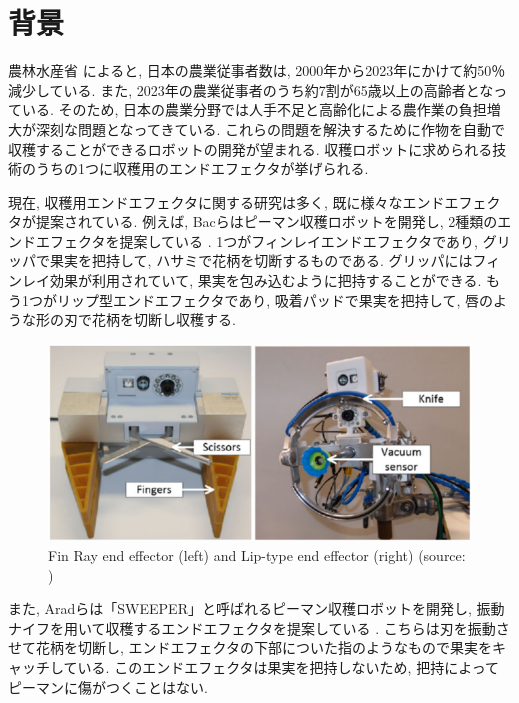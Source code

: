 
\section{背景}
農林水産省 \cite{farmer} によると, 日本の農業従事者数は, 2000年から2023年にかけて約50％減少している.
また, 2023年の農業従事者のうち約7割が65歳以上の高齢者となっている.
そのため, 日本の農業分野では人手不足と高齢化による農作業の負担増大が深刻な問題となってきている.
これらの問題を解決するために作物を自動で収穫することができるロボットの開発が望まれる.
収穫ロボットに求められる技術のうちの1つに収穫用のエンドエフェクタが挙げられる.

\vspace{5mm}

現在, 収穫用エンドエフェクタに関する研究は多く, 既に様々なエンドエフェクタが提案されている.
例えば, Bacらはピーマン収穫ロボットを開発し, 2種類のエンドエフェクタを提案している \cite{finray}.
1つがフィンレイエンドエフェクタであり, グリッパで果実を把持して, ハサミで花柄を切断するものである.
グリッパにはフィンレイ効果が利用されていて, 果実を包み込むように把持することができる.
もう1つがリップ型エンドエフェクタであり, 吸着パッドで果実を把持して, 唇のような形の刃で花柄を切断し収穫する.

\begin{figure}[H]
     \centering
     \includegraphics[width=130mm]{images/png/finray.png}
     \caption[Fin Ray end effector (left) and Lip-type end effector (right)]{Fin Ray end effector (left) and Lip-type end effector (right) (source: \cite{finray})}
     \label{Fig:finray}
\end{figure}

また, Aradらは「SWEEPER」と呼ばれるピーマン収穫ロボットを開発し, 振動ナイフを用いて収穫するエンドエフェクタを提案している \cite{sweeper}.
こちらは刃を振動させて花柄を切断し, エンドエフェクタの下部についた指のようなもので果実をキャッチしている.
このエンドエフェクタは果実を把持しないため, 把持によってピーマンに傷がつくことはない.

